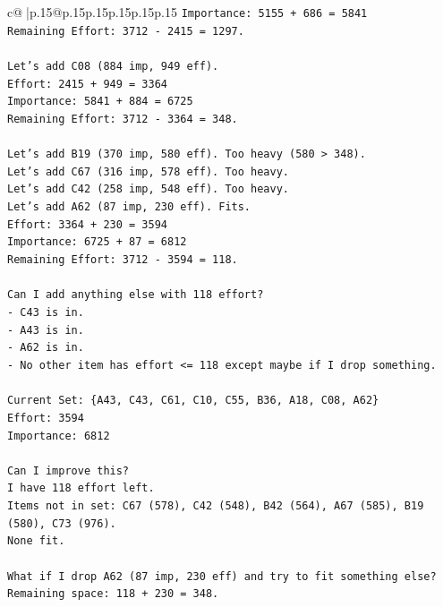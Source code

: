\documentclass{article}
\begin{document}
{\begin{supertabular}{c@{$\;$}|p{.15\linewidth}@{}p{.15\linewidth}p{.15\linewidth}p{.15\linewidth}p{.15\linewidth}p{.15\linewidth}}
{{{\texttt{Importance: 5155 + 686 = 5841} \\
\texttt{Remaining Effort: 3712 {-} 2415 = 1297.} \\
\\ 
\texttt{Let's add C08 (884 imp, 949 eff).} \\
\texttt{Effort: 2415 + 949 = 3364} \\
\texttt{Importance: 5841 + 884 = 6725} \\
\texttt{Remaining Effort: 3712 {-} 3364 = 348.} \\
\\ 
\texttt{Let's add B19 (370 imp, 580 eff). Too heavy (580 > 348).} \\
\texttt{Let's add C67 (316 imp, 578 eff). Too heavy.} \\
\texttt{Let's add C42 (258 imp, 548 eff). Too heavy.} \\
\texttt{Let's add A62 (87 imp, 230 eff). Fits.} \\
\texttt{Effort: 3364 + 230 = 3594} \\
\texttt{Importance: 6725 + 87 = 6812} \\
\texttt{Remaining Effort: 3712 {-} 3594 = 118.} \\
\\ 
\texttt{Can I add anything else with 118 effort?} \\
\texttt{{-} C43 is in.} \\
\texttt{{-} A43 is in.} \\
\texttt{{-} A62 is in.} \\
\texttt{{-} No other item has effort <= 118 except maybe if I drop something.} \\
\\ 
\texttt{Current Set: \{A43, C43, C61, C10, C55, B36, A18, C08, A62\}} \\
\texttt{Effort: 3594} \\
\texttt{Importance: 6812} \\
\\ 
\texttt{Can I improve this?} \\
\texttt{I have 118 effort left.} \\
\texttt{Items not in set: C67 (578), C42 (548), B42 (564), A67 (585), B19 (580), C73 (976).} \\
\texttt{None fit.} \\
\\ 
\texttt{What if I drop A62 (87 imp, 230 eff) and try to fit something else?} \\
\texttt{Remaining space: 118 + 230 = 348.} \\
}}}
\end{supertabular}}
\end{document}
